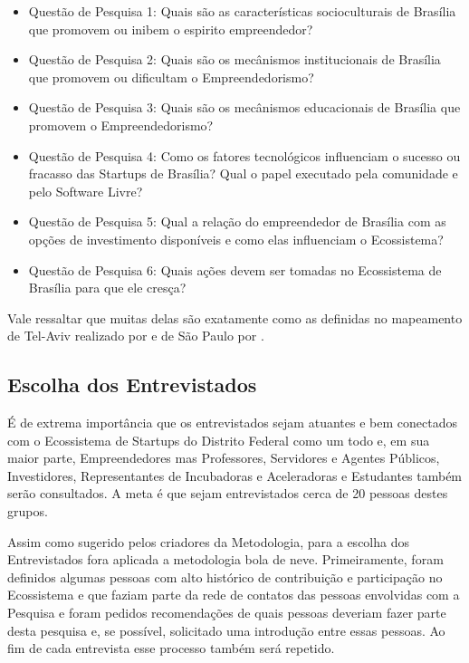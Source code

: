\begin{itemize}
  \item Questão de Pesquisa 1: Quais são as características socioculturais de Brasília que promovem ou inibem o espirito empreendedor?
  \item Questão de Pesquisa 2: Quais são os mecânismos institucionais de Brasília que promovem ou dificultam o Empreendedorismo?
  \item Questão de Pesquisa 3: Quais são os mecânismos educacionais de Brasília que promovem o Empreendedorismo?
  \item Questão de Pesquisa 4: Como os fatores tecnológicos influenciam o sucesso ou fracasso das Startups de Brasília? Qual o papel executado pela comunidade e pelo Software Livre?
  \item Questão de Pesquisa 5: Qual a relação do empreendedor de Brasília com as opções de investimento disponíveis e como elas influenciam o Ecossistema?
  \item Questão de Pesquisa 6: Quais ações devem ser tomadas no Ecossistema de Brasília para que ele cresça?
\end{itemize}

Vale ressaltar que muitas delas são exatamente como as definidas no mapeamento de Tel-Aviv realizado por  e de São Paulo por .

\subsection{Escolha dos Entrevistados}
\label{subsection:escolha_dos_entrevistados}

É de extrema importância que os entrevistados sejam atuantes e bem conectados com o Ecossistema de Startups do Distrito Federal como um todo e, em sua maior parte, Empreendedores mas Professores, Servidores e Agentes Públicos, Investidores, Representantes de Incubadoras e Aceleradoras e Estudantes também serão consultados. A meta é que sejam entrevistados cerca de 20 pessoas destes grupos.

Assim como sugerido pelos criadores da Metodologia, para a escolha dos Entrevistados fora aplicada a metodologia bola de neve. Primeiramente, foram definidos algumas pessoas com alto histórico de contribuição e participação no Ecossistema e que faziam parte da rede de contatos das pessoas envolvidas com a Pesquisa e foram pedidos recomendações de quais pessoas deveriam fazer parte desta pesquisa e, se possível, solicitado uma introdução entre essas pessoas. Ao fim de cada entrevista esse processo também será repetido. 

